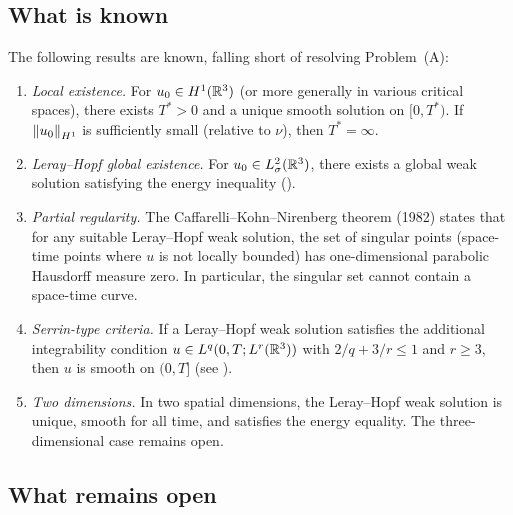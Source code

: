 \subsection{What is known}

\begin{remark}\label{rem:partial-results}
  The following results are known, falling short of resolving Problem~(A):
  \begin{enumerate}[label=(\roman*)]
    \item \emph{Local existence.} For $u_{0} \in H^{1}(\mathbb{R}^{3})$ (or more generally in
      various critical spaces), there exists $T^{*} > 0$ and a unique smooth solution on
      $[0, T^{*})$.  If $\left\lVert u_{0} \right\rVert_{H^{1}}$ is sufficiently small (relative to
      $\nu$), then $T^{*} = \infty$.
    \item \emph{Leray--Hopf global existence.} For $u_{0} \in L^{2}_\sigma(\mathbb{R}^{3})$, there
      exists a global weak solution satisfying the energy inequality
      ().
    \item \emph{Partial regularity.} The Caffarelli--Kohn--Nirenberg theorem (1982) states
      that for any suitable Leray--Hopf weak solution, the set of singular points
      (space-time points where $u$ is not locally bounded) has one-dimensional parabolic
      Hausdorff measure zero.  In particular, the singular set cannot contain a
      space-time curve.
    \item \emph{Serrin-type criteria.} If a Leray--Hopf weak solution satisfies the
      additional integrability condition $u \in L^{q}(0, T; L^{r}(\mathbb{R}^{3}))$ with
      $2/q + 3/r \le 1$ and $r \ge 3$, then $u$ is smooth on $(0, T]$ (see
      ).
    \item \emph{Two dimensions.} In two spatial dimensions, the Leray--Hopf weak
      solution is unique, smooth for all time, and satisfies the energy equality.  The
      three-dimensional case remains open.
  \end{enumerate}
\end{remark}

\subsection{What remains open}

